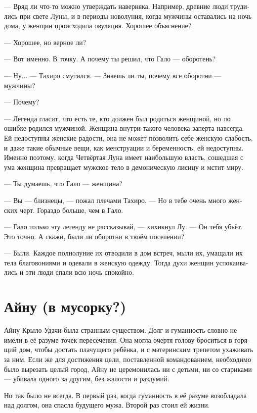 \documentclass[a4paper,12pt,fleqn]{book}\usepackage{cooltooltips}\usepackage{polyglossia}\setdefaultlanguage[babelshorthands=true]{russian}\setotherlanguage{english}\defaultfontfeatures{Ligatures=TeX,Mapping=tex-text} \usepackage{xcolor}\definecolor{lightgray}{HTML}{bbbbbb}\color{lightgray}\newcommand{\ml}[3]{\textenglish{\textcolor{black}{#3}}}
\begin{document}
{--- Вряд ли что-то можно утверждать наверняка.
Например, древние люди трудились при свете Луны, и в периоды новолуния, когда мужчины оставались на ночь дома, у женщин происходила овуляция.
Хорошее объяснение?

--- Хорошее, но верное ли?

--- Вот именно.
В точку.
А почему ты решил, что Гало --- оборотень?

--- Ну... --- Тахиро смутился.
--- Знаешь ли ты, почему все оборотни --- мужчины?

--- Почему?

--- Легенда гласит, что есть те, кто должен был родиться женщиной, но по ошибке родился мужчиной.
Женщина внутри такого человека заперта навсегда.
Ей недоступны женские радости, она не может позволить себе женскую слабость, и даже такие обычные вещи, как менструации и беременность, ей недоступны.
Именно поэтому, когда Четвёртая Луна имеет наибольшую власть, сошедшая с ума женщина превращает мужское тело в демоническую лисицу и мстит миру.

--- Ты думаешь, что Гало --- женщина?

--- Вы --- близнецы, --- пожал плечами Тахиро.
--- Но в тебе очень много женских черт.
Гораздо больше, чем в Гало.

--- Гало только эту легенду не рассказывай, --- хихикнул Лу.
--- Он тебя убьёт.
Это точно.
А скажи, были ли оборотни в твоём поселении?

--- Были.
Каждое полнолуние их отводили в дом встреч, мыли их, умащали их тела благовониями и одевали в женскую одежду.
Тогда духи женщин успокаивались и эти люди спали всю ночь спокойно.

\section{Айну (в мусорку?)}

Айну Крыло Удачи была странным существом.
Долг и гуманность словно не имели в её разуме точек пересечения.
Она могла очертя голову броситься в горящий дом, чтобы достать плачущего ребёнка, и с материнским трепетом ухаживать за ним.
Если же для достижения цели, поставленной командованием, необходимо было вырезать целый город, Айну не церемонилась ни с детьми, ни со стариками --- убивала одного за другим, без жалости и раздумий.

Но так было не всегда.
В первый раз, когда гуманность в её разуме возобладала над долгом, она спасла будущего мужа.
Второй раз стоил ей жизни.

}
\end{document}
